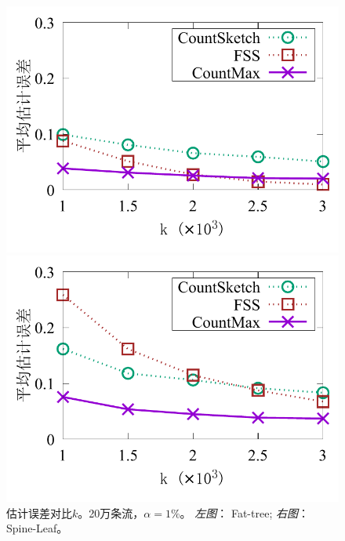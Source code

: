 \begin{figure}[ht]
	\centering
	\begin{minipage}[t]{0.49\linewidth}
		\centering
		\includegraphics[width=\linewidth]{fig/ft_k_appr_200000_099.pdf}
	\end{minipage}\vspace{-0.6em}%
	\begin{minipage}[t]{0.49\linewidth}
		\centering
		\includegraphics[width=\linewidth]{fig/hy_k_appr_200000_099.pdf}
	\end{minipage}\vspace{-0.6em}%
	\caption{\textnormal{估计误差对比$k$。20万条流，$\alpha = 1\%$。 \textit{左图}： Fat-tree; \textit{右图}： Spine-Leaf。}}
	\label{fig:acc,k,20,1}
\end{figure}

